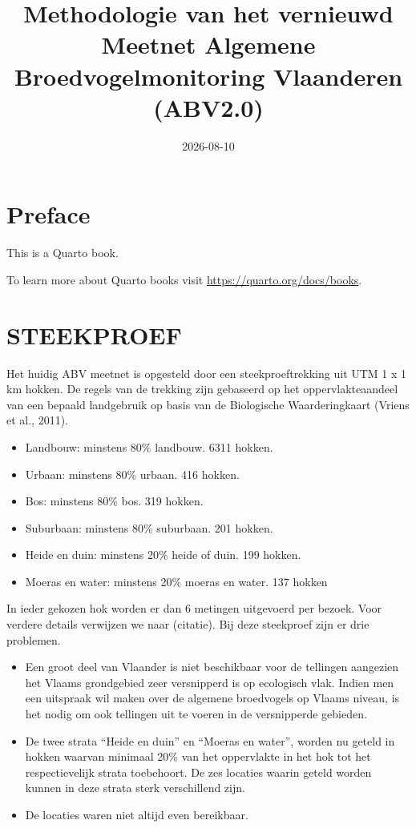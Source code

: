 \documentclass[twoside]{extreport}
\title{Methodologie van het vernieuwd Meetnet Algemene
Broedvogelmonitoring Vlaanderen (ABV2.0)}
\author{}
\date{2026-08-10}
\providecommand{\tightlist}{%
  \setlength{\itemsep}{0pt}\setlength{\parskip}{0pt}}
\begin{document}

\maketitle



\chapter*{Preface}\label{preface}


This is a Quarto book.

To learn more about Quarto books visit
\url{https://quarto.org/docs/books}.


\chapter{STEEKPROEF}\label{steekproef}

Het huidig ABV meetnet is opgesteld door een steekproeftrekking uit UTM
1 x 1 km hokken. De regels van de trekking zijn gebaseerd op het
oppervlakteaandeel van een bepaald landgebruik op basis van de
Biologische Waarderingkaart (Vriens et al., 2011).

\begin{itemize}
\tightlist
\item
  Landbouw: minstens 80\% landbouw. 6311 hokken.
\item
  Urbaan: minstens 80\% urbaan. 416 hokken.
\item
  Bos: minstens 80\% bos. 319 hokken.
\item
  Suburbaan: minstens 80\% suburbaan. 201 hokken.
\item
  Heide en duin: minstens 20\% heide of duin. 199 hokken.
\item
  Moeras en water: minstens 20\% moeras en water. 137 hokken
\end{itemize}

In ieder gekozen hok worden er dan 6 metingen uitgevoerd per bezoek.
Voor verdere details verwijzen we naar (citatie). Bij deze steekproef
zijn er drie problemen.

\begin{itemize}
\tightlist
\item
  Een groot deel van Vlaander is niet beschikbaar voor de tellingen
  aangezien het Vlaams grondgebied zeer versnipperd is op ecologisch
  vlak. Indien men een uitspraak wil maken over de algemene broedvogels
  op Vlaams niveau, is het nodig om ook tellingen uit te voeren in de
  versnipperde gebieden.
\item
  De twee strata ``Heide en duin'' en ``Moeras en water'', worden nu
  geteld in hokken waarvan minimaal 20\% van het oppervlakte in het hok
  tot het respectievelijk strata toebehoort. De zes locaties waarin
  geteld worden kunnen in deze strata sterk verschillend zijn.
\item
  De locaties waren niet altijd even bereikbaar.
\end{itemize}
\end{document}
